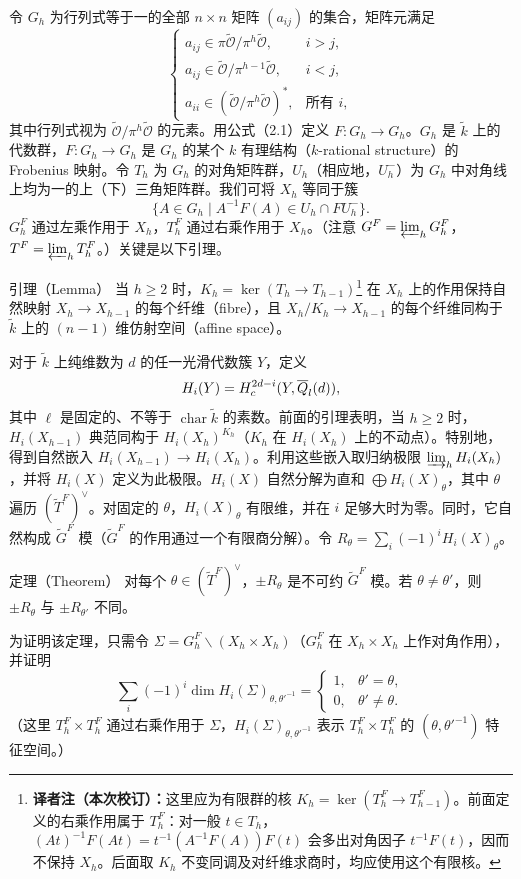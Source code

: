 令 $G_h$ 为行列式等于一的全部 $n\times n$ 矩阵 $(a_{ij})$ 的集合，矩阵元满足
\[
\begin{cases}
a_{ij}\in\pi\widetilde{\mathcal O}/\pi^h\widetilde{\mathcal O},&i>j,\\
a_{ij}\in\widetilde{\mathcal O}/\pi^{h-1}\widetilde{\mathcal O},&i<j,\\
a_{ii}\in(\widetilde{\mathcal O}/\pi^h\widetilde{\mathcal O})^*,&\text{所有 }i,
\end{cases}
\]
其中行列式视为 $\widetilde{\mathcal O}/\pi^h\widetilde{\mathcal O}$ 的元素。用公式（2.1）定义 $F:G_h\to G_h$。$G_h$ 是 $\widetilde k$ 上的代数群，$F:G_h\to G_h$ 是 $G_h$ 的某个 $k$ 有理结构（$k$-rational structure）的 Frobenius 映射。令 $T_h$ 为 $G_h$ 的对角矩阵群，$U_h$（相应地，$U_h^-$）为 $G_h$ 中对角线上均为一的上（下）三角矩阵群。我们可将 $X_h$ 等同于簇
\[
\{A\in G_h\mid A^{-1}F(A)\in U_h\cap FU_h^-\}.
\]
$G_h^F$ 通过左乘作用于 $X_h$，$T_h^F$ 通过右乘作用于 $X_h$。（注意 $\widetilde G^F=\varprojlim_hG_h^F$，$\widetilde T^F=\varprojlim_hT_h^F$。）关键是以下引理。
\begin{originaltheorem}{引理（Lemma）}
当 $h\geq2$ 时，$K_h=\ker(T_h\to T_{h-1})$\footnote{\textbf{译者注（本次校订）：}这里应为有限群的核 $K_h=\ker(T_h^F\to T_{h-1}^F)$。前面定义的右乘作用属于 $T_h^F$：对一般 $t\in T_h$，$(At)^{-1}F(At)=t^{-1}(A^{-1}F(A))F(t)$ 会多出对角因子 $t^{-1}F(t)$，因而不保持 $X_h$。后面取 $K_h$ 不变同调及对纤维求商时，均应使用这个有限核。} 在 $X_h$ 上的作用保持自然映射 $X_h\to X_{h-1}$ 的每个纤维（fibre），且 $X_h/K_h\to X_{h-1}$ 的每个纤维同构于 $\widetilde k$ 上的 $(n-1)$ 维仿射空间（affine space）。
\end{originaltheorem}
对于 $\widetilde k$ 上纯维数为 $d$ 的任一光滑代数簇 $Y$，定义
\[
H_i(Y)=H_c^{2d-i}(Y,\overline\Q_\ell(d)),
\]
其中 $\ell$ 是固定的、不等于 $\operatorname{char}\widetilde k$ 的素数。前面的引理表明，当 $h\geq2$ 时，$H_i(X_{h-1})$ 典范同构于 $H_i(X_h)^{K_h}$（$K_h$ 在 $H_i(X_h)$ 上的不动点）。特别地，得到自然嵌入 $H_i(X_{h-1})\to H_i(X_h)$。利用这些嵌入取归纳极限 $\varinjlim_hH_i(X_h)$，并将 $H_i(X)$ 定义为此极限。$H_i(X)$ 自然分解为直和 $\bigoplus H_i(X)_\theta$，其中 $\theta$ 遍历 $(\widetilde T^F)^\vee$。对固定的 $\theta$，$H_i(X)_\theta$ 有限维，并在 $i$ 足够大时为零。同时，它自然构成 $\widetilde G^F$ 模（$\widetilde G^F$ 的作用通过一个有限商分解）。令 $R_\theta=\sum_i(-1)^iH_i(X)_\theta$。
\begin{originaltheorem}{定理（Theorem）}
对每个 $\theta\in(\widetilde T^F)^\vee$，$\pm R_\theta$ 是不可约 $\widetilde G^F$ 模。若 $\theta\ne\theta'$，则 $\pm R_\theta$ 与 $\pm R_{\theta'}$ 不同。
\end{originaltheorem}
为证明该定理，只需令 $\Sigma=G_h^F\backslash(X_h\times X_h)$（$G_h^F$ 在 $X_h\times X_h$ 上作对角作用），并证明
\[
\sum_i(-1)^i\dim H_i(\Sigma)_{\theta,\theta'^{-1}}
=\begin{cases}1,&\theta'=\theta,\\0,&\theta'\ne\theta.\end{cases}
\]
（这里 $T_h^F\times T_h^F$ 通过右乘作用于 $\Sigma$，$H_i(\Sigma)_{\theta,\theta'^{-1}}$ 表示 $T_h^F\times T_h^F$ 的 $(\theta,\theta'^{-1})$ 特征空间。）

